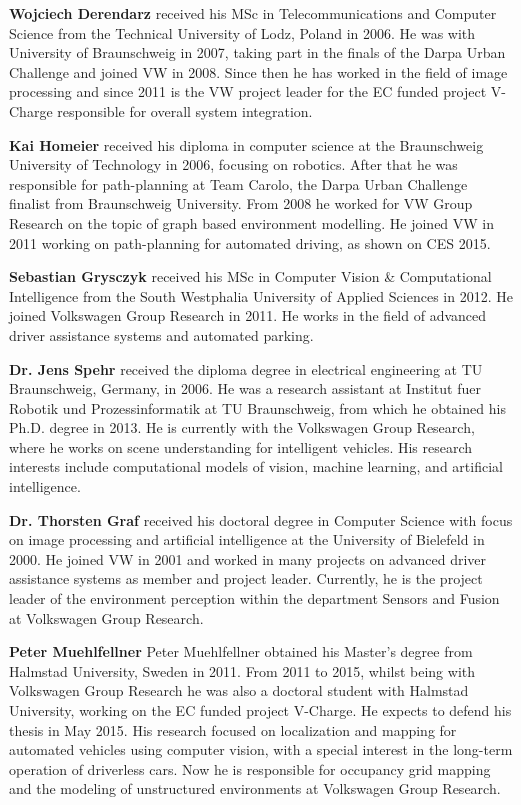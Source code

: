 {\bf Wojciech Derendarz} received his MSc in Telecommunications and Computer Science from the Technical University of Lodz, Poland in 2006. He was with University of Braunschweig in 2007, taking part in the finals of the Darpa Urban Challenge and joined VW in 2008. Since then he has worked in the field of image processing and since 2011 is the VW project leader for the EC funded project V-Charge responsible for overall system integration.

{\bf Kai Homeier} received his diploma in computer science at the Braunschweig University of Technology in 2006, focusing on robotics. After that he was responsible for path-planning at Team Carolo, the Darpa Urban Challenge finalist from Braunschweig University. From 2008 he worked for VW Group Research on the topic of graph based environment modelling. He joined VW in 2011 working on path-planning for automated driving, as shown on CES 2015.

{\bf Sebastian Grysczyk} received his MSc in Computer Vision \& Computational Intelligence from the South Westphalia University of Applied Sciences in 2012. He joined Volkswagen Group Research in 2011. He works in the field of advanced driver assistance systems and automated parking.

{\bf Dr. Jens Spehr} received the diploma degree in electrical engineering at TU Braunschweig, Germany, in 2006. He was a research assistant at Institut fuer Robotik und Prozessinformatik at TU Braunschweig, from which he obtained his Ph.D. degree in 2013. He is currently with the Volkswagen Group Research, where he works on scene understanding for intelligent vehicles. His research interests include computational models of vision, machine learning, and artificial intelligence.

{\bf Dr. Thorsten Graf} received his doctoral degree in Computer Science with focus on image processing and artificial intelligence at the University of Bielefeld in 2000. He joined VW in 2001 and worked in many projects on advanced driver assistance systems as member and project leader. Currently, he is the project leader of the environment perception within the department Sensors and Fusion at Volkswagen Group Research.

{\bf Peter Muehlfellner} Peter Muehlfellner obtained his Master’s degree from Halmstad University, Sweden in 2011. From 2011 to 2015, whilst being with Volkswagen Group Research he was also a doctoral student with Halmstad University, working on the EC funded project V-Charge. He expects to defend his thesis in May 2015. His research focused on localization and mapping for automated vehicles using computer vision, with a special interest in the long-term operation of driverless cars. Now he is responsible for occupancy grid mapping and the modeling of unstructured environments at Volkswagen Group Research.


